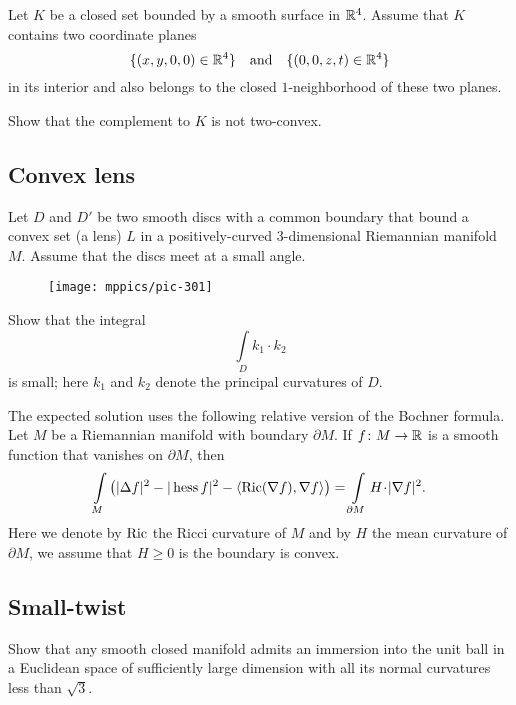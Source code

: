 \begin{pr}
Let $K$ be a closed set bounded by a smooth surface
in $\mathbb{R}^4$.
Assume that $K$ contains two coordinate planes 
$$\{(x,y,0,0)\in\mathbb{R}^4\}
\quad
\text{and}
\quad
\{(0,0,z,t)\in\mathbb{R}^4\}$$
in its interior 
and also belongs to the closed $1$-neighborhood of these two planes.

Show that the complement to $K$ is not two-convex.
\end{pr}


\subsection*{Convex lens\thm}
\label{Convex lens}

\begin{pr} Let $D$ and $D'$ be two smooth discs with a common boundary that bound a convex set (a lens) $L$ in a positively-curved 3-dimensional Riemannian manifold $M$.
Assume that the discs meet at a small angle.

\begin{wrapfigure}{o}{25 mm}
\vskip-2mm
\centering
\texttt{[image: mppics/pic-301]}
\vskip0mm
\end{wrapfigure}

Show that the integral 
\[\int\limits_{D}k_1\cdot k_2\]
is small; here $k_1$ and $k_2$ denote the principal curvatures of $D$.
\end{pr}

The expected solution uses the following relative version of the Bochner formula.
Let $M$ be a Riemannian manifold with boundary $\partial M$.
If $f\colon M\to \mathbb{R}$ is a smooth function that vanishes on $\partial M$,
then 
\[\int\limits_M \left(|\Delta f|^2
-|\Hess f|^2
-\langle\mathrm{Ric}(\nabla f),\nabla f\rangle\right)
=\int\limits_{\partial M}
H\cdot|\nabla f|^2.\]
Here we denote by $\operatorname{\rm Ric}$ the Ricci curvature of $M$ 
and by $H$ the mean curvature of $\partial M$, we assume that $H\ge 0$ is the boundary is convex.


\subsection*{Small-twist}
\label{Small-twist}

\begin{pr}
Show that any smooth closed manifold admits an immersion into the unit ball in a Euclidean space of sufficiently large dimension
with all its normal curvatures less than $\sqrt{3}$.
\end{pr}


